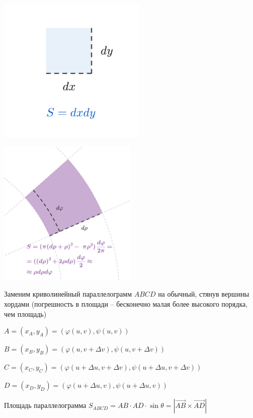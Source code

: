 \documentclass[12pt]{article}
\begin{document}
    \begin{multicols}{2}
        \centering
        \includegraphics[height=7cm]{calculus/images/calculus_2024_04_10_1}

        \includegraphics[height=7cm]{calculus/images/calculus_2024_04_10_2}
    \end{multicols}

    Заменим криволинейный параллелограмм $ABCD$ на обычный, стянув вершины хордами (погрешность в площади -- бесконечно малая более высокого порядка, чем площадь)

    $A = (x_A, y_A) = (\varphi(u, v), \psi(u, v))$

    $B = (x_B, y_B) = (\varphi(u, v+\Delta v), \psi(u, v+\Delta v))$

    $C = (x_C, y_C) = (\varphi(u + \Delta u, v+\Delta v), \psi(u + \Delta u, v+\Delta v))$

    $D = (x_D, y_D) = (\varphi(u + \Delta u, v), \psi(u + \Delta u, v))$

    Площадь параллелограмма $S_{ABCD} = AB \cdot AD \cdot \sin \theta = |\overrightarrow{AB} \times \overrightarrow{AD}|$
\end{document}

